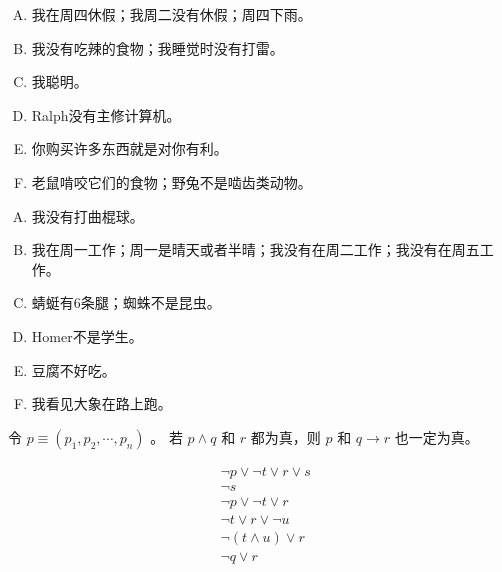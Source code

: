 {{        %
        \begin{practices}
            \begin{enumerate}[A.]
                \item 我在周四休假；我周二没有休假；周四下雨。
                \item 我没有吃辣的食物；我睡觉时没有打雷。
                \item 我聪明。
                \item Ralph没有主修计算机。
                \item 你购买许多东西就是对你有利。
                \item 老鼠啃咬它们的食物；野兔不是啮齿类动物。
            \end{enumerate}
        \end{practices}

        \begin{practices}
            \begin{enumerate}[A.]
                \item 我没有打曲棍球。
                \item 我在周一工作；周一是晴天或者半晴；我没有在周二工作；我没有在周五工作。
                \item 蜻蜓有6条腿；蜘蛛不是昆虫。
                \item Homer不是学生。
                \item 豆腐不好吃。
                \item 我看见大象在路上跑。
            \end{enumerate}
        \end{practices}

        \begin{practices}
            令 $p \equiv (p_1, p_2, \cdots , p_n)$ 。
            若 $p \wedge q$ 和 $r$ 都为真，则 $p$ 和 $q \rightarrow r$ 也一定为真。
        \end{practices}

        \begin{practices}
            \begin{align*}
                &\neg p \vee \neg t \vee r \vee s \\
                &\neg s \\
                &\neg p \vee \neg t \vee r \\
                &\neg t \vee r \vee \neg u \\
                &\neg (t \wedge u) \vee r \\
                &\neg q \vee r
            \end{align*}
        \end{practices}

}}
